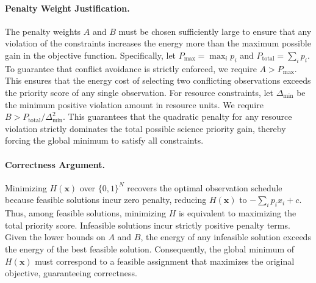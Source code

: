 \documentclass[12pt]{article}
\begin{document}
\paragraph{Penalty Weight Justification.}
The penalty weights $A$ and $B$ must be chosen sufficiently large to ensure that any violation of the constraints increases the energy more than the maximum possible gain in the objective function. Specifically, let $P_{\max} = \max_i p_i$ and $P_{\text{total}} = \sum_i p_i$. To guarantee that conflict avoidance is strictly enforced, we require $A > P_{\max}$. This ensures that the energy cost of selecting two conflicting observations exceeds the priority score of any single observation. For resource constraints, let $\Delta_{\min}$ be the minimum positive violation amount in resource units. We require $B > P_{\text{total}} / \Delta_{\min}^2$. This guarantees that the quadratic penalty for any resource violation strictly dominates the total possible science priority gain, thereby forcing the global minimum to satisfy all constraints.

\paragraph{Correctness Argument.}
Minimizing $H(\mathbf{x})$ over $\{0,1\}^N$ recovers the optimal observation schedule because feasible solutions incur zero penalty, reducing $H(\mathbf{x})$ to $-\sum_i p_i x_i + c$. Thus, among feasible solutions, minimizing $H$ is equivalent to maximizing the total priority score. Infeasible solutions incur strictly positive penalty terms. Given the lower bounds on $A$ and $B$, the energy of any infeasible solution exceeds the energy of the best feasible solution. Consequently, the global minimum of $H(\mathbf{x})$ must correspond to a feasible assignment that maximizes the original objective, guaranteeing correctness.
\end{document}
